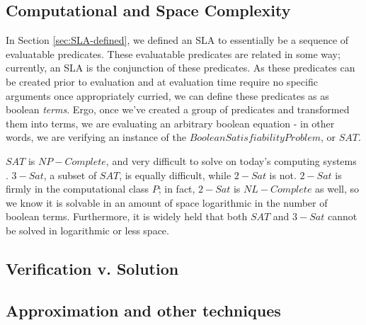 \subsection{Computational and Space Complexity}
In Section \ref{sec:SLA-defined}, we defined an SLA to essentially be a sequence of evaluatable predicates.  These evaluatable predicates are related in some way; currently, an SLA is the conjunction of these predicates.  As these predicates can be created prior to evaluation and at evaluation time require no specific arguments once appropriately curried, we can define these predicates as as boolean {\it terms}.  Ergo, once we've created a group of predicates and transformed them into terms, we are evaluating an arbitrary boolean equation - in other words, we are verifying an instance of the  $ Boolean Satisfiability Problem $, or $ SAT $.

$ SAT $ is $ NP-Complete $, and very difficult to solve on today's computing systems \cite{comptheory:sipser:intro-comp-theory}.  $ 3-Sat $, a subset of $ SAT $, is equally difficult, while $ 2-Sat $ is not.  $ 2-Sat $ is firmly in the computational class $ P $; in fact, $ 2-Sat $ is $ NL-Complete $ as well, so we know it is solvable in an amount of space logarithmic in the number of boolean terms\cite{comptheory:papadimitriou:computational-complexity}.  Furthermore, it is widely held that both $ SAT $ and $ 3-Sat $ cannot be solved in logarithmic or less space.

\subsection{Verification v. Solution}

\subsection{Approximation and other techniques}





